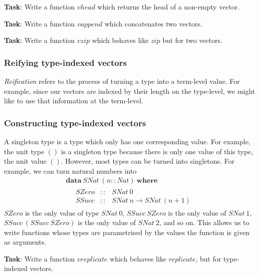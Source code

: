 
\textbf{Task}: Write a function $\mathit{vhead}$ which returns the head of a non-empty vector.

\textbf{Task}: Write a function $\mathit{vappend}$ which concatenates two vectors.

\textbf{Task}: Write a function $\mathit{vzip}$ which behaves like $\mathit{zip}$ but for two vectors.

\subsubsection{Reifying type-indexed vectors}

\emph{Reification} refers to the process of turning a type into a term-level value. For example, since our vectors are indexed by their length on the type-level, we might like to use that information at the term-level.




\subsubsection{Constructing type-indexed vectors}

A singleton type is a type which only has one corresponding value. For example, the unit type $()$ is a singleton type because there is only one value of this type, the unit value $()$. However, most types can be turned into singletons. For example, we can turn natural numbers into
\begin{displaymath}
\begin{array}{l}
\mathbf{data}~\mathit{SNat}~(n :: \mathit{Nat})~\mathbf{where} \\
\quad \begin{array}{lcl}
\mathit{SZero} & :: & \mathit{SNat}~0 \\
\mathit{SSucc} & :: & \mathit{SNat}~n \to \mathit{SNat}~(n+1)
\end{array}
\end{array}
\end{displaymath}
$\mathit{SZero}$ is the only value of type $\mathit{SNat}~0$, $\mathit{SSucc}~\mathit{SZero}$ is the only value of $\mathit{SNat}~1$, $\mathit{SSucc}~(\mathit{SSucc}~\mathit{SZero})$ is the only value of $\mathit{SNat}~2$, and so on. This allows us to write functions whose types are parametrised by the values the function is given as arguments. 

\textbf{Task}: Write a function $\mathit{vreplicate}$ which behaves like $\mathit{replicate}$, but for type-indexed vectors. 